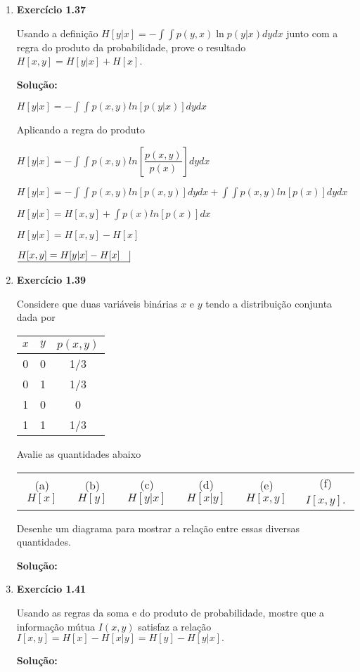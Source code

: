 \begin{enumerate}
\item \textbf{Exercício 1.37} \par

Usando a definição $H[y|x] = - \int \int p(y,x) \ln p(y|x) dy dx$ junto com a regra do produto da probabilidade, prove o resultado $H[x,y] = H[y|x] + H[x]$. 
\newline \par
\textbf{Solução:}

$H[y|x] = \displaystyle - \int \int p(x,y) ln[p(y|x)] dy dx $

Aplicando a regra do produto

$H[y|x] = \displaystyle - \int \int p(x,y) ln\left[\dfrac{p(x,y)}{p(x)}\right] dy dx $

$H[y|x] = \displaystyle - \int \int p(x,y) ln[p(x,y)] dy dx + \int \int p(x,y) ln[p(x)] dy dx$

$H[y|x] = \displaystyle H[x,y] + \int p(x) ln[p(x)] dx$

$H[y|x] = H[x,y] - H[x]$

$\underline{H[x,y] = H[y|x] - H[x] \quad} \vline$

\item \textbf{Exercício 1.39} \par

Considere que duas variáveis binárias $x$ e $y$ tendo a distribuição conjunta dada por
\begin{center}
    \begin{tabular}{|c|c|c|}
    \hline
    $x$ & $y$ & $p(x, y)$ \\
    \hline
    0 & 0 & 1/3\\
    \hline
    0 & 1 & 1/3\\
    \hline
    1 & 0 & 0\\
    \hline
    1 & 1 & 1/3\\
    \hline
    \end{tabular}
\end{center}
Avalie as quantidades abaixo
\begin{center}
    \begin{tabular}{c c c c c c}
     (a)$H[x]$ & (b)$H[y]$ & (c)$H[y|x]$ & (d)$H[x|y]$ & (e)$H[x,y]$ & (f)$I[x,y]$. \\
    \end{tabular}
\end{center}
Desenhe um diagrama para mostrar a relação entre essas diversas quantidades.
\newline \par
\textbf{Solução:}

\item \textbf{Exercício 1.41} \par

Usando as regras da soma e do produto de probabilidade, mostre que a informação mútua $I(x, y)$ satisfaz a relação $I[x,y]=H[x]-H[x|y]=H[y]-H[y|x].$
\newline \par
\textbf{Solução:}














\end{enumerate}